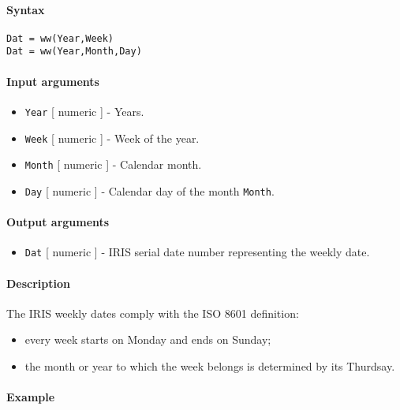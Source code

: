 


	\paragraph{Syntax}\label{syntax}

\begin{verbatim}
Dat = ww(Year,Week)
Dat = ww(Year,Month,Day)
\end{verbatim}

\paragraph{Input arguments}\label{input-arguments}

\begin{itemize}
\item
  \texttt{Year} {[} numeric {]} - Years.
\item
  \texttt{Week} {[} numeric {]} - Week of the year.
\item
  \texttt{Month} {[} numeric {]} - Calendar month.
\item
  \texttt{Day} {[} numeric {]} - Calendar day of the month
  \texttt{Month}.
\end{itemize}

\paragraph{Output arguments}\label{output-arguments}

\begin{itemize}
\itemsep1pt\parskip0pt
\item
  \texttt{Dat} {[} numeric {]} - IRIS serial date number representing
  the weekly date.
\end{itemize}

\paragraph{Description}\label{description}

The IRIS weekly dates comply with the ISO 8601 definition:

\begin{itemize}
\item
  every week starts on Monday and ends on Sunday;
\item
  the month or year to which the week belongs is determined by its
  Thurdsay.
\end{itemize}

\paragraph{Example}\label{example}


